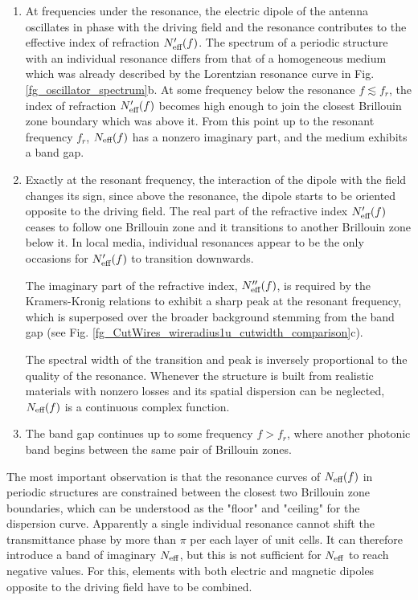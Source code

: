 \begin{enumerate}
\item{At frequencies under the resonance, the electric dipole of the antenna oscillates in phase with the driving field and the resonance contributes to the effective index of refraction $N_{\text{eff} }'(f)$. 
The spectrum of a periodic structure with an individual resonance differs from that of a homogeneous medium which was already described by the Lorentzian resonance curve in Fig. \ref{fg_oscillator_spectrum}b.
At some frequency below the resonance $f \lesssim f_r$, the index of refraction $N_{\text{eff} }'(f)$ becomes high enough to join the closest Brillouin zone boundary which was above it. From this point up to the resonant frequency $f_r$, $N_{\text{eff} }(f)$ has a nonzero imaginary part, and the medium exhibits a band gap.
} 
\item{Exactly at the resonant frequency, the interaction of the dipole with the field changes its sign, since above the resonance, the dipole starts to be oriented opposite to the driving field. 
The real part of the refractive index $N_{\text{eff} }'(f)$ ceases to follow one Brillouin zone and it transitions to another Brillouin zone below it. In local media, individual resonances appear to be the only occasions for $N_{\text{eff} }'(f)$ to transition downwards.

The imaginary part of the refractive index, $N_{\text{eff} }''(f)$, is required by the Kramers-Kronig relations to exhibit a sharp peak at the resonant frequency, which is superposed over the broader background stemming from the band gap (see Fig. \ref{fg_CutWires_wireradius1u_cutwidth_comparison}c). 

The spectral width of the transition and peak is inversely proportional to the quality of the resonance. Whenever the structure is built from realistic materials with nonzero losses and its spatial dispersion can be neglected, $N_{\text{eff} }(f)$ is a continuous complex function.
} 
\item{The band gap continues up to some frequency $f > f_r$, where another photonic band begins between the same pair of Brillouin zones.  
} 
\end{enumerate}

The most important observation is that the resonance curves of $N_{\text{eff} }(f)$ in periodic structures are constrained between the closest two Brillouin zone boundaries, which can be understood as the "floor" and "ceiling" for the dispersion curve. Apparently a single individual resonance cannot shift the transmittance phase by more than $\pi$ per each layer of unit cells. It can therefore introduce a band of imaginary $N_{\text{eff} }$, but this is not sufficient for $N_{\text{eff} }$ to reach negative values. For this, elements with both electric and magnetic dipoles opposite to the driving field have to be combined.

